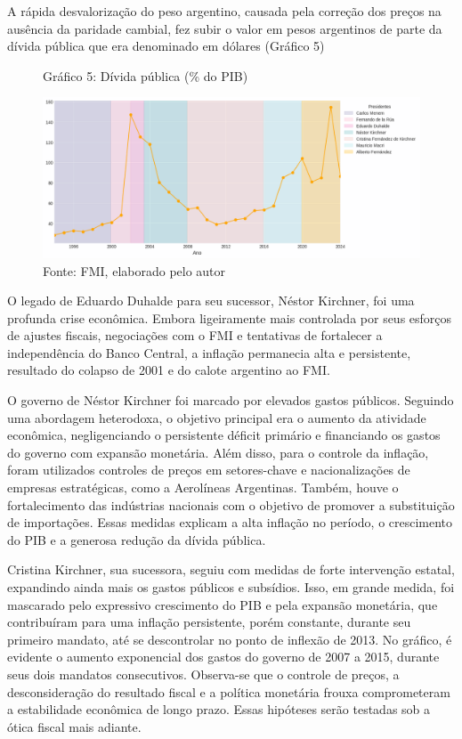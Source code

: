 \documentclass[a4paper, 12pt, openany, oneside, brazil]{abntex2}
\begin{document}
A rápida desvalorização do peso argentino, causada pela correção dos preços na ausência da paridade cambial, fez subir o valor em pesos argentinos de parte da dívida pública que era denominado em dólares (Gráfico 5)

\begin{figure}[h!]
	\caption*{Gráfico 5: Dívida pública (\% do PIB)}
	\includegraphics[width=\textwidth]{dados/divida_publica}
	\caption*{Fonte: FMI, elaborado pelo autor}
\end{figure}

O legado de Eduardo Duhalde para seu sucessor, Néstor Kirchner, foi uma profunda crise econômica. Embora ligeiramente mais controlada por seus esforços de ajustes fiscais, negociações com o FMI e tentativas de fortalecer a independência do Banco Central, a inflação permanecia alta e persistente, resultado do colapso de 2001 e do calote argentino ao FMI.

O governo de Néstor Kirchner foi marcado por elevados gastos públicos. Seguindo uma abordagem heterodoxa, o objetivo principal era o aumento da atividade econômica, negligenciando o persistente déficit primário e financiando os gastos do governo com expansão monetária. Além disso, para o controle da inflação, foram utilizados controles de preços em setores-chave e nacionalizações de empresas estratégicas, como a Aerolíneas Argentinas. Também, houve o fortalecimento das indústrias nacionais com o objetivo de promover a substituição de importações. Essas medidas explicam a alta inflação no período, o crescimento do PIB e a generosa redução da dívida pública.


Cristina Kirchner, sua sucessora, seguiu com medidas de forte intervenção estatal, expandindo ainda mais os gastos públicos e subsídios. Isso, em grande medida, foi mascarado pelo expressivo crescimento do PIB e pela expansão monetária, que contribuíram para uma inflação persistente, porém constante, durante seu primeiro mandato, até se descontrolar no ponto de inflexão de 2013. No gráfico, é evidente o aumento exponencial dos gastos do governo de 2007 a 2015, durante seus dois mandatos consecutivos. Observa-se que o controle de preços, a desconsideração do resultado fiscal e a política monetária frouxa comprometeram a estabilidade econômica de longo prazo. Essas hipóteses serão testadas sob a ótica fiscal mais adiante.
\end{document}
